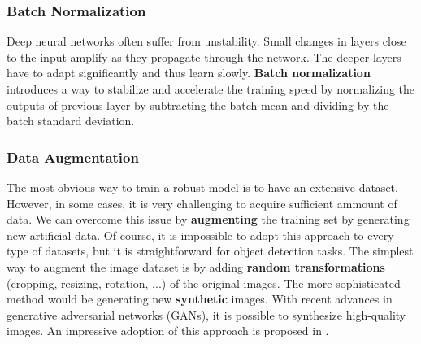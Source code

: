 \subsubsection{Batch Normalization}
Deep neural networks often suffer from unstability. Small changes in layers close to the input amplify as they propagate through the network. The deeper layers have to adapt significantly and thus learn slowly. \textbf{Batch normalization} introduces a way to stabilize and accelerate the training speed by normalizing the outputs of previous layer by subtracting the batch mean and dividing by the batch standard deviation.

\subsubsection{Data Augmentation}
The most obvious way to train a robust model is to have an extensive dataset. However, in some cases, it is very challenging to acquire sufficient ammount of data. We can overcome this issue by 
\textbf{augmenting} the training set by generating new artificial data. Of course, it is impossible to adopt this approach to every type of datasets, but it is straightforward for object detection tasks. The simplest way to augment the image dataset is by adding \textbf{random transformations} (cropping, resizing, rotation, ...) of the original images. The more sophisticated method would be generating new \textbf{synthetic} images. With recent advances in generative adversarial networks (GANs), it is possible to synthesize high-quality images. An impressive adoption of this approach is proposed in \cite{wei2019generative}.













